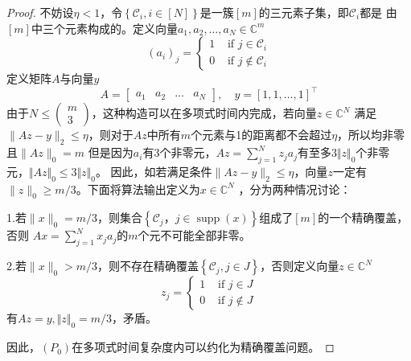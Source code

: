 \begin{proof}
    不妨设$\eta <1$，令$\left\{\mathcal{C}_i,i \in[N]\right\}$是一簇$[m]$的三元素子集，即$\mathcal{C}_i$都是
    由$[m]$中三个元素构成的。定义向量$a_1,a_2,\ldots,a_N \in \mathbb{C}^m$
    \begin{equation}
        \left(a_i\right)_j= \begin{cases}1 & \text { if } j \in \mathcal{C}_i \\ 0 & \text { if } j \notin \mathcal{C}_i\end{cases}
    \end{equation}
    定义矩阵$A$与向量$y$
    \begin{equation}
        A=\left[\begin{array}{l|l|l|l}
        a_1 & a_2 & \ldots & a_N
        \end{array}\right],\quad y=[1,1,\ldots,1]^{\top}
    \end{equation}
由于$N \leq\left(\begin{array}{c}m \\ 3\end{array}\right)$，这种构造可以在多项式时间内完成，若向量$z\in \mathbb{C}^N$
满足$\|A z-y\|_2 \leq \eta$，则对于$Az$中所有$m$个元素与1的距离都不会超过$\eta$，所以均非零且$\|A z\|_0=m$
但是因为$a_i$有3个非零元，$A z=\sum_{j=1}^N z_j a_j$有至多$3\Vert z\Vert_0$个非零元，$\Vert Az\Vert_0\le 3\Vert z\Vert _0$。
因此，如若满足条件$\|A z-y\|_2 \leq \eta$，向量$z$一定有$\|z\|_0 \geq m / 3$。下面将算法输出定义为$x\in \mathbb{C}^N$
，分为两种情况讨论：\par
1.若$\|x\|_0=m / 3$，则集合$\left\{\mathcal{C}_j，j \in \operatorname{supp}(x)\right\}$组成了$[m]$的一个精确覆盖，否则
$A x=\sum_{j=1}^N x_j a_j$的$m$个元不可能全部非零。\par
2.若$\|x\|_0>m / 3$，则不存在精确覆盖$\left\{\mathcal{C}_j,j \in J\right\}$，否则定义向量$z\in \mathbb{C}^N$
\begin{equation*}
    z_j= \begin{cases}1 & \text { if } j \in J \\ 0 & \text { if } j \notin J\end{cases}
\end{equation*}
有$Az=y,\Vert z\Vert_0=m/3$，矛盾。\par
因此，$(P_0)$在多项式时间复杂度内可以约化为精确覆盖问题。
\end{proof}
